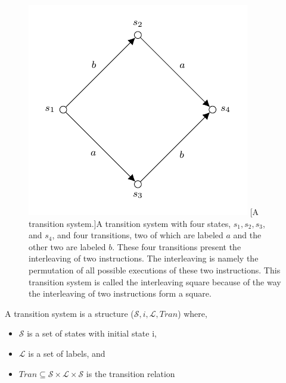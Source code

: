     \begin{figure}[ht]
        \centering
        \includegraphics[scale=1.3]{Figures/2.Models-for-concurrency/transition-system.pdf}
        [A transition system.]{A transition system with four states, $s_{1}, s_{2}, s_{3}$, and $s_{4}$, and four transitions, two of which are labeled $a$ and the other two are labeled $b$. These four transitions present the interleaving of two instructions. The interleaving is namely the permutation of all possible executions of these two instructions. This transition system is called the interleaving square because of the way the interleaving of two instructions form a square.}
        \label{fig:transition-system}
      
    \end{figure}
    
    
    \begin{definition}\label{def:transition-system}
        A transition system is a structure ($\mathcal{S}, i, \mathcal{L}, Tran$) where,
        \begin{itemize}
            \item $\mathcal{S}$ is a set of states with initial state i,
            \item $\mathcal{L}$ is a set of labels, and
            \item $Tran \subseteq \mathcal{S} \times \mathcal{L} \times \mathcal{S}$ is the transition relation
        \end{itemize}
    \end{definition}
    
